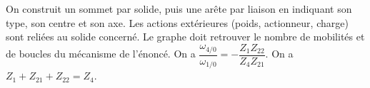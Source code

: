 \begin{corrigebox}
On construit un sommet par solide, puis une arête par liaison en
        indiquant son type, son centre et son axe. Les actions extérieures (poids,
        actionneur, charge) sont reliées au solide concerné. Le graphe doit retrouver le
        nombre de mobilités et de boucles du mécanisme de l'énoncé.
On a $\dfrac{\omega_{4/0}}{\omega_{1/0}}=-\dfrac{Z_1Z_{22}}{Z_4Z_{21}}$.
On a $Z_1+Z_{21}+Z_{22}= Z_4$.
\end{corrigebox}
